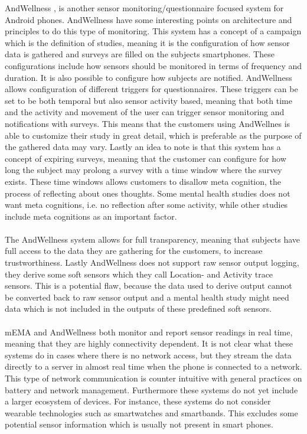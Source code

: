 AndWellness \parencite{hicks2010andwellness}, is another sensor monitoring/questionnaire focused system for Android phones. AndWellness have some interesting points on architecture and principles to do this type of monitoring. This system has a concept of a campaign which is the definition of studies, meaning it is the configuration of how sensor data is gathered and surveys are filled on the subjects smartphones. These configurations include how sensors should be monitored in terms of frequency and duration. It is also possible to configure how subjects are notified. AndWellness allows configuration of different triggers for questionnaires. These triggers can be set to be both temporal but also sensor activity based, meaning that both time and the activity and movement of the user can trigger sensor monitoring and notifications with surveys. This means that the customers using AndWellnes is able to customize their study in great detail, which is preferable as the purpose of the gathered data may vary. Lastly an idea to note is that this system has a concept of expiring surveys, meaning that the customer can configure for how long the subject may prolong a survey with a time window where the survey exists. These time windows allows customers to disallow meta cognition, the process of reflecting about ones thoughts. Some mental health studies does not want meta cognitions, i.e. no reflection after some activity, while other studies include meta cognitions as an important factor. 
\\\\
The AndWellness system allows for full transparency, meaning that subjects have full access to the data they are gathering for the customers, to increase trustworthiness. Lastly AndWellness does not support raw sensor output logging, they derive some soft sensors which they call Location- and Activity trace sensors. This is a potential flaw, because the data used to derive output cannot be converted back to raw sensor output and a mental health study might need data which is not included in the outputs of these predefined soft sensors.
\\\\
mEMA and AndWellness both monitor and report sensor readings in real time, meaning that they are highly connectivity dependent. It is not clear what these systems do in cases where there is no network access, but they stream the data directly to a server in almost real time when the phone is connected to a network. This type of network communication is counter intuitive with general practices on battery and network management. Furthermore these systems do not yet include a larger ecosystem of devices. For instance, these systems do not consider wearable technologies such as smartwatches and smartbands. This excludes some potential sensor information which is usually not present in smart phones.

